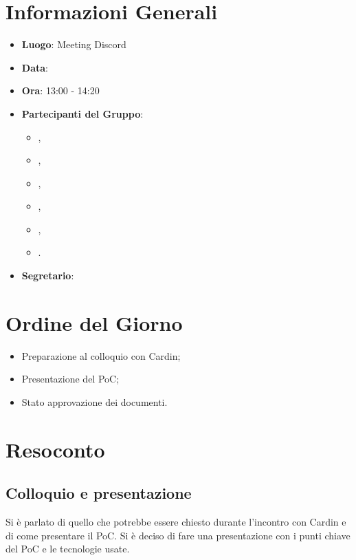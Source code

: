 \section{Informazioni Generali}

\begin{itemize}
\item{\textbf{Luogo}}: Meeting Discord
\item{\textbf{Data}}: \D
\item{\textbf{Ora}}: 13:00 - 14:20
\item{\textbf{Partecipanti del Gruppo}}: 
	\begin{itemize}
	\item{\EP{},} 
	\item{\FP{},}
	\item{\GC{},}
	\item{\LW{},}
	\item{\MG{},}
	\item{\PV{}.}
	\end{itemize} 
\item{\textbf{Segretario}}: \PV{}	
\end{itemize}

\section{Ordine del Giorno}
\begin{itemize}
\item{Preparazione al colloquio con Cardin};
\item{Presentazione del PoC};
\item{Stato approvazione dei documenti}.
\end{itemize}

\section{Resoconto}
 
\subsection{Colloquio e presentazione} 
Si è parlato di quello che potrebbe essere chiesto durante l'incontro con Cardin e di come presentare il PoC. Si è deciso di fare una presentazione con i punti chiave del PoC e le tecnologie usate.
 
